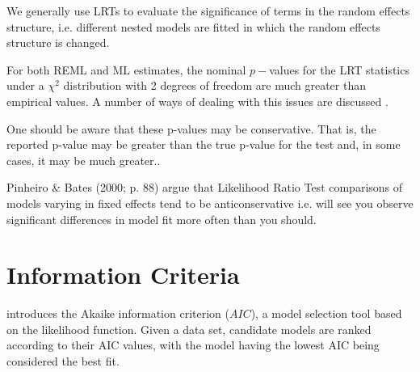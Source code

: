 \documentclass[12pt, a4paper]{report}
\theoremstyle{plain}
\theoremstyle{definition}
\theoremstyle{remark}
\begin{document}
We generally use LRTs to evaluate the significance of terms in the random effects structure, i.e. different nested models are fitted in which the random effects structure is changed.


For both REML and ML estimates, the nominal $p-$values for the LRT statistics under a $\chi^2$ distribution with 2 degrees of freedom are much greater than empirical values. A number of ways of dealing with this issues are discussed \citep[pg.86]{pb}.

One should be aware that these p-values may be conservative. That is, the reported p-value may be greater than the true p-value for the test and, in some cases, it may be much greater.\citep[pg.87]{pb}.



Pinheiro \& Bates (2000; p. 88) argue that Likelihood Ratio Test comparisons of models varying in fixed effects tend to be anticonservative i.e. 
will see you observe significant differences in model fit more often than you should. 




\section{Information Criteria}

\citet{akaike} introduces the Akaike information criterion ($AIC$), a model selection tool based on the likelihood function. Given a data set, candidate models are ranked according to their AIC values, with the model having the lowest AIC being considered the best fit.
\end{document}
